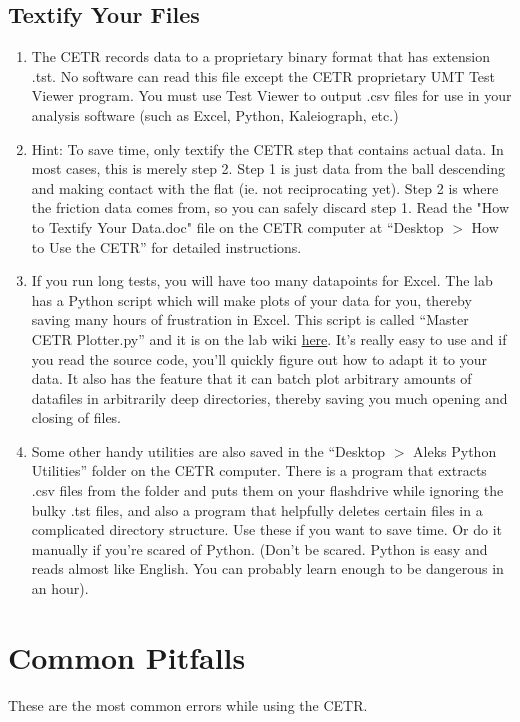 \documentclass[10pt, letterpaper]{article}
\begin{document}
\subsection{Textify Your Files}
\begin{enumerate}
\item The CETR records data to a proprietary binary format that has extension .tst. No software can read this file except the CETR proprietary UMT Test Viewer program. You must use Test Viewer to output .csv files for use in your analysis software (such as Excel, Python, Kaleiograph, etc.)

\item Hint: To save time, only textify the CETR step that contains actual data. In most cases, this is merely step 2. Step 1 is just data from the ball descending and making contact with the flat (ie. not reciprocating yet). Step 2 is where the friction data comes from, so you can safely discard step 1. Read the "How to Textify Your Data.doc" file on the CETR computer at ``Desktop $>$ How to Use the CETR'' for detailed instructions.

\item If you run long tests, you will have too many datapoints for Excel. The lab has a Python script which will make plots of your data for you, thereby saving many hours of frustration in Excel. This script is called ``Master CETR Plotter.py'' and it is on the lab wiki \href{http://etl.wikischolars.columbia.edu/Software}{here}. It's really easy to use and if you read the source code, you'll quickly figure out how to adapt it to your data. It also has the feature that it can batch plot arbitrary amounts of datafiles in arbitrarily deep directories, thereby saving you much opening and closing of files. 

\item Some other handy utilities are also saved in the ``Desktop $>$ Aleks Python Utilities'' folder on the CETR computer. There is a program that extracts .csv files from the folder and puts them on your flashdrive while ignoring the bulky .tst files, and also a program that helpfully deletes certain files in a complicated directory structure. Use these if you want to save time. Or do it manually if you're scared of Python. (Don't be scared. Python is easy and reads almost like English. You can probably learn enough to be dangerous in an hour).
\end{enumerate}

\section{Common Pitfalls}
These are the most common errors while using the CETR.
\end{document}
